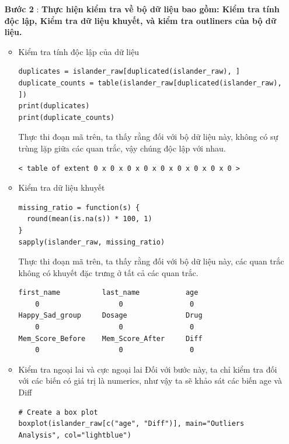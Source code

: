 \begin{itemize}
    \item[\textbf{Bước 2}]: \textbf{Thực hiện kiểm tra về bộ dữ liệu bao gồm: Kiểm tra tính độc lập, Kiểm tra dữ liệu khuyết, và kiểm tra outliners của bộ dữ liệu.}
        \begin{itemize}
            \item Kiểm tra tính độc lập của dữ liệu
                \begin{lstlisting}
duplicates = islander_raw[duplicated(islander_raw), ]
duplicate_counts = table(islander_raw[duplicated(islander_raw), ])
print(duplicates)
print(duplicate_counts)
                \end{lstlisting}
                Thực thi đoạn mã trên, ta thấy rằng đối với bộ dữ liệu này, không có sự trùng lặp giữa các quan trắc, vậy chúng độc lập với nhau.
                \begin{lstlisting}
< table of extent 0 x 0 x 0 x 0 x 0 x 0 x 0 x 0 x 0 >
                \end{lstlisting}
            \item Kiểm tra dữ liệu khuyết
                \begin{lstlisting}
missing_ratio = function(s) {
  round(mean(is.na(s)) * 100, 1)
}
sapply(islander_raw, missing_ratio)
                \end{lstlisting}
                Thực thi đoạn mã trên, ta thấy rằng đối với bộ dữ liệu này, các quan trắc không có khuyết đặc trưng ở tất cả các quan trắc.
                \begin{lstlisting}
first_name          last_name           age
    0                   0                0
Happy_Sad_group     Dosage              Drug
    0                   0                0
Mem_Score_Before    Mem_Score_After     Diff
    0                   0                0  
                \end{lstlisting}
            \item Kiểm tra ngoại lai và cực ngoại lai
                Đối với bước này, ta chỉ kiểm tra đối với các biến có giá trị là numerics, như vậy ta sẽ khảo sát các biến age và Diff
                \begin{lstlisting}
# Create a box plot
boxplot(islander_raw[c("age", "Diff")], main="Outliers Analysis", col="lightblue")
                \end{lstlisting}
                    

\end{itemize}
\end{itemize}
